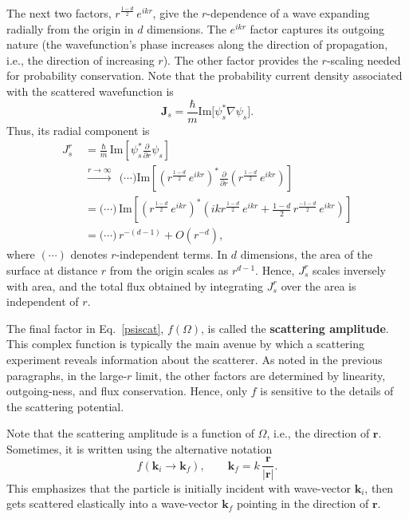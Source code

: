 \documentclass[prx,12pt]{revtex4-2}
\begin{document}
The next two factors, $r^{\frac{1-d}{2}} \, e^{ikr}$, give the
$r$-dependence of a wave expanding radially from the origin in $d$
dimensions.  The $e^{ikr}$ factor captures its outgoing nature (the
wavefunction's phase increases along the direction of propagation,
i.e., the direction of increasing $r$).  The other factor provides the
$r$-scaling needed for probability conservation.  Note that the
probability current density associated with the scattered wavefunction
is
\begin{equation}
  \mathbf{J}_s = \frac{\hbar}{m} \mathrm{Im}\big[\psi_s^*\nabla\psi_s\big].
\end{equation}
Thus, its radial component is
\begin{equation}
  \begin{aligned}J_{s}^r\; &= \frac{\hbar}{m}\, \mathrm{Im}\left[\psi_s^* \frac{\partial}{\partial r}\psi_s\right] \\
    &\overset{r\rightarrow\infty}{\longrightarrow}\;\, \big(\cdots\big)
    \mathrm{Im}\left[\left(r^{\frac{1-d}{2}} \, e^{ikr}\right)^* \frac{\partial}{\partial r} \left(r^{\frac{1-d}{2}} \, e^{ikr}\right)\right] \\
    &= \big(\cdots\big)\,
    \mathrm{Im}\left[\left(r^{\frac{1-d}{2}} \, e^{ikr}\right)^* \left(ik r^{\frac{1-d}{2}} \, e^{ikr} + \frac{1-d}{2} \, r^{\frac{-1-d}{2}} \, e^{ikr}\right)\right] \\
    &= \big(\cdots\big) \, r^{-(d-1)} + O(r^{-d}),
  \end{aligned}
  \label{Jsrcalc}
\end{equation}
where $(\cdots)$ denotes $r$-independent terms.  In $d$ dimensions,
the area of the surface at distance $r$ from the origin scales as
$r^{d-1}$.  Hence, $J_{s}^r$ scales inversely with area, and the total
flux obtained by integrating $J_{s}^r$ over the area is independent of
$r$.

The final factor in Eq.~\eqref{psiscat}, $f(\Omega)$, is called the
\textbf{scattering amplitude}.  This complex function is typically the
main avenue by which a scattering experiment reveals information about
the scatterer.  As noted in the previous paragraphs, in the large-$r$
limit, the other factors are determined by linearity, outgoing-ness,
and flux conservation.  Hence, only $f$ is sensitive to the details of
the scattering potential.

Note that the scattering amplitude is a function of $\Omega$, i.e.,
the direction of $\mathbf{r}$.  Sometimes, it is written using the
alternative notation
\begin{equation}
  f(\mathbf{k}_i \rightarrow \mathbf{k}_f), \qquad
  \mathbf{k}_f = k\, \frac{\mathbf{r}}{|\mathbf{r}|}.
\end{equation}
This emphasizes that the particle is initially incident with
wave-vector $\mathbf{k}_i$, then gets scattered elastically into a
wave-vector $\mathbf{k}_f$ pointing in the direction of $\mathbf{r}$.
\end{document}
